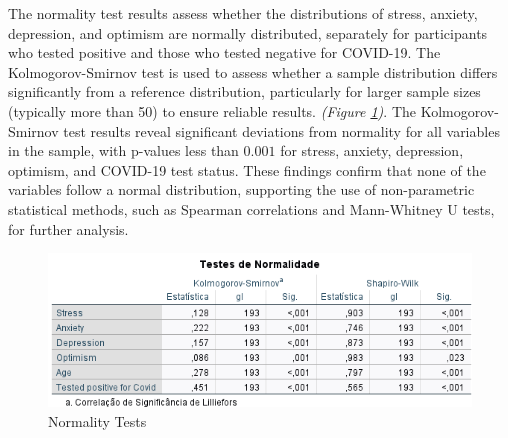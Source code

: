 \documentclass[a4paper]{article}
\begin{document}
\vspace{3em}
\noindent
The normality test results assess whether the distributions of stress, anxiety, depression, and optimism are normally distributed,
separately for participants who tested positive and those who tested negative for COVID-19.
The Kolmogorov-Smirnov test is used to assess whether a sample distribution differs significantly from a reference distribution,
particularly for larger sample sizes (typically more than 50) to ensure reliable results. \textit{(Figure \ref{fig:normalityTest})}.
\vspace{0.5em}\newline
The Kolmogorov-Smirnov test results reveal significant deviations from normality for all variables in the sample,
with p-values less than \(\boldsymbol{0.001}\) for stress, anxiety, depression, optimism, and COVID-19 test status.
These findings confirm that none of the variables follow a normal distribution, supporting the use of non-parametric statistical methods,
such as Spearman correlations and Mann-Whitney U tests, for further analysis.
\vspace{1.5em}

\newpage

\begin{figure}[H]
  \centering
  \caption{Normality Tests}
  \label{fig:normalityTest}
  \includegraphics[width=\textwidth]{img/normality_test.png}  %
\end{figure}
\end{document}
